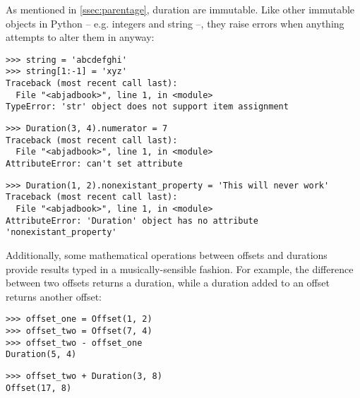 \noindent As mentioned in \autoref{ssec:parentage}, duration are immutable.
Like other immutable objects in Python -- e.g. integers and string --, they
raise errors when anything attempts to alter them in anyway:

\begin{comment}
<abjad>[allow_exceptions]
string = 'abcdefghi'
string[1:-1] = 'xyz'
Duration(3, 4).numerator = 7
Duration(1, 2).nonexistant_property = 'This will never work'
</abjad>
\end{comment}

\begin{abjadbookoutput}
\begin{singlespacing}
\vspace{-0.5\baselineskip}
\begin{lstlisting}
>>> string = 'abcdefghi'
>>> string[1:-1] = 'xyz'
Traceback (most recent call last):
  File "<abjadbook>", line 1, in <module>
TypeError: 'str' object does not support item assignment
\end{lstlisting}
\begin{lstlisting}
>>> Duration(3, 4).numerator = 7
Traceback (most recent call last):
  File "<abjadbook>", line 1, in <module>
AttributeError: can't set attribute
\end{lstlisting}
\begin{lstlisting}
>>> Duration(1, 2).nonexistant_property = 'This will never work'
Traceback (most recent call last):
  File "<abjadbook>", line 1, in <module>
AttributeError: 'Duration' object has no attribute 'nonexistant_property'
\end{lstlisting}
\end{singlespacing}
\end{abjadbookoutput}

\noindent Additionally, some mathematical operations between offsets and
durations provide results typed in a musically-sensible fashion. For example,
the difference between two offsets returns a duration, while a duration added
to an offset returns another offset:

\begin{comment}
<abjad>
offset_one = Offset(1, 2)
offset_two = Offset(7, 4)
offset_two - offset_one
offset_two + Duration(3, 8)
</abjad>
\end{comment}

\begin{abjadbookoutput}
\begin{singlespacing}
\vspace{-0.5\baselineskip}
\begin{lstlisting}
>>> offset_one = Offset(1, 2)
>>> offset_two = Offset(7, 4)
>>> offset_two - offset_one
Duration(5, 4)
\end{lstlisting}
\begin{lstlisting}
>>> offset_two + Duration(3, 8)
Offset(17, 8)
\end{lstlisting}
\end{singlespacing}
\end{abjadbookoutput}

